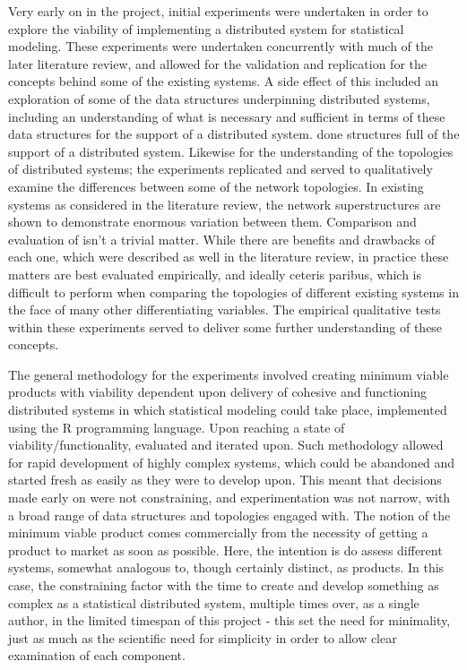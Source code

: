Very early on in the project, initial experiments were undertaken in order to explore the viability of implementing a distributed system for statistical modeling. 
These experiments were undertaken concurrently with much of the later literature review, and allowed for the validation and replication for the concepts behind some of the existing systems.
A side effect of this included an exploration of some of the data structures underpinning distributed systems, including an understanding of what is necessary and sufficient in terms of these data structures for the support of a distributed system.
done structures full of the support of a distributed system.
Likewise for the understanding of the topologies of distributed systems; the experiments replicated and served to qualitatively examine the differences between some of the network topologies.
In existing systems as considered in the literature review, the network superstructures are shown to demonstrate enormous variation between them.
Comparison and evaluation of isn't a trivial matter.
While there are benefits and drawbacks of each one, which were described as well in the literature review, in practice these matters are best evaluated empirically, and ideally ceteris paribus, which is difficult to perform when comparing the topologies of different existing systems in the face of many other differentiating variables.
The empirical qualitative tests within these experiments served to deliver some further understanding of these concepts.

The general methodology for the experiments involved creating minimum viable products with viability dependent upon delivery of cohesive and functioning distributed systems in which statistical modeling could take place, implemented using the R programming language.
Upon reaching a state of viability/functionality, evaluated and iterated upon.
Such methodology allowed for rapid development of highly complex systems, which could be abandoned and started fresh as easily as they were to develop upon.
This meant that decisions made early on were not constraining, and experimentation was not narrow, with a broad range of data structures and topologies engaged with.
The notion of the minimum viable product comes commercially from the necessity of getting a product to market as soon as possible.
Here, the intention is do assess different systems, somewhat analogous to, though certainly distinct, as products.
In this case, the constraining factor with the time to create and develop something as complex as a statistical distributed system, multiple times over, as a single author, in the limited timespan of this project - this set the need for minimality, just as much as the scientific need for simplicity in order to allow clear examination of each component.

